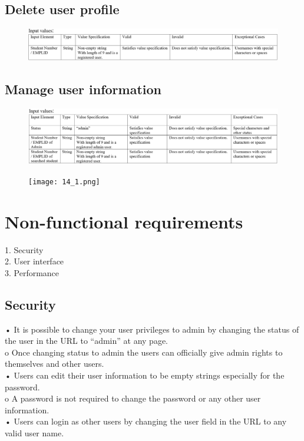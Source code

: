 \documentclass{article}
\begin{document}
\subsection{Delete user profile}
\begin{figure}[ht!]
\hspace*{-2.5cm} 
\includegraphics[width=180mm]{12.png}
\end{figure}

\subsection{Manage user information}
\begin{figure}[ht!]
\hspace*{-2.5cm} 
\includegraphics[width=180mm]{13.png}
\end{figure}

\begin{figure}[ht!]
\hspace*{-2.5cm} 
\texttt{[image: 14\_1.png]}
\end{figure}

\clearpage

\section{Non-functional requirements}
1.	Security\\
2.	User interface\\
3.	Performance\\

\subsection{Security}
•	It is possible to change your user privileges to admin by changing the status of the user in the URL to “admin” at any page.\\
o	Once changing status to admin the users can officially give admin rights to themselves and other users.\\
•	Users can edit their user information to be empty strings especially for the password.\\
o	A password is not required to change the password or any other user information.\\
•	Users can login as other users by changing the user field in the URL to any valid user name.\\
\end{document}
